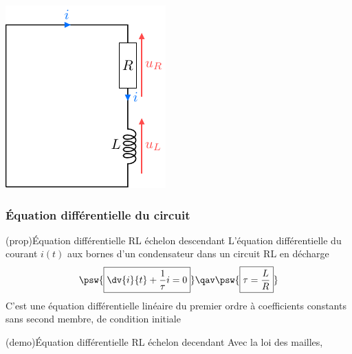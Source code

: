 \documentclass[../../main/main.tex]{subfiles}
\begin{document}
\begin{tcb*}[sidebyside, righthand ratio=.30]
\begin{center}
{      \includegraphics[width=.9\linewidth]{circ_rl-decharge}
    }%
    \label{fig:circ_rl-decharge}
  \end{center}
\end{tcb*}

\subsubsection{Équation différentielle du circuit}
	\begin{tcb*}[label=prop:eqdiffrl, sidebyside,
  list entry={\lte\theprop~:~Équa. diff. RL descendant}]
  (prop){Équation différentielle RL échelon descendant}
		L'équation différentielle du courant $i(t)$ aux bornes d'un
		condensateur dans un circuit RL en décharge
			\[
		\psw{%
        \boxed{\dv{i}{t} + \frac{1}{\tau}i = 0}
		}%
    \qav
    \psw{%
      \boxed{\tau = \frac{L}{R}}
    }%
      \]
		\tcblower
		C'est une équation différentielle linéaire du premier ordre à
		coefficients constants sans second membre, de condition initiale
		\psw{%
			\[ \boxed{i(0^-) = i(0^+) = \frac{E}{R}}\]
		}%
	\end{tcb*}
	\begin{tcb*}[label=demo:eqdiffrl,
  list entry={\lte\thedemo~:~Équa. diff. RL descendant}]
  (demo){Équation différentielle RL échelon decendant}
		Avec la loi des mailles,
	\end{tcb*}
\end{document}
